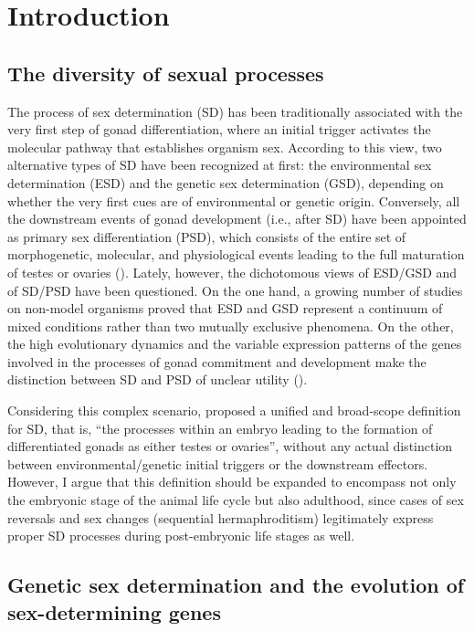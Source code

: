 \documentclass[../main.tex]{subfiles}
\begin{document}
{
\chapter{Introduction}
\label{introduction}
}

\section{The diversity of sexual processes}
The process of sex determination (SD) has been traditionally associated with the very first step of gonad differentiation, where an initial trigger activates the molecular pathway that establishes organism sex. According to this view, two alternative types of SD have been recognized at first: the environmental sex determination (ESD) and the genetic sex determination (GSD), depending on whether the very first cues are of environmental or genetic origin. Conversely, all the downstream events of gonad development (i.e., after SD) have been appointed as primary sex differentiation (PSD), which consists of the entire set of morphogenetic, molecular, and physiological events leading to the full maturation of testes or ovaries (\textbf{\cite{uller2011origin, beukeboom2014evolution}}). Lately, however, the dichotomous views of ESD/GSD and of SD/PSD have been questioned. On the one hand, a growing number of studies on non-model organisms proved that ESD and GSD represent a continuum of mixed conditions rather than two mutually exclusive phenomena. On the other, the high evolutionary dynamics and the variable expression patterns of the genes involved in the processes of gonad commitment and development make the distinction between SD and PSD of unclear utility (\textbf{\cite{beukeboom2014evolution}}).

Considering this complex scenario, \textbf{\cite{uller2011origin}} proposed a unified and broad-scope definition for SD, that is, “the processes within an embryo leading to the formation of differentiated gonads as either testes or ovaries”, without any actual distinction between environmental/genetic initial triggers or the downstream effectors. However, I argue that this definition should be expanded to encompass not only the embryonic stage of the animal life cycle but also adulthood, since cases of sex reversals and sex changes (sequential hermaphroditism) legitimately express proper SD processes during post-embryonic life stages as well.

\section{Genetic sex determination and the evolution of sex-determining genes}
\end{document}

